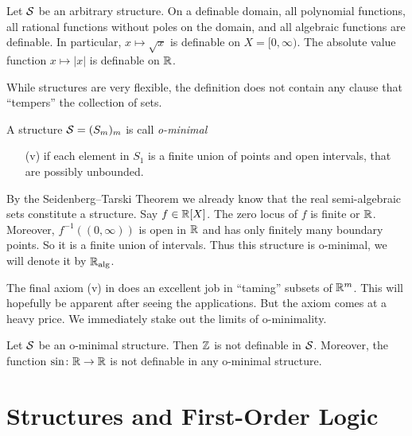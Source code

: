 \begin{example}
  Let ${\mathcal S}$ be an arbitrary structure. 
  On a definable domain, 
  all polynomial functions, all rational functions without poles on the
  domain, and all algebraic functions are definable.
  In particular, $x\mapsto \sqrt{x}$ is definable on $X=[0,\infty)$.
  The absolute value function $x\mapsto |x|$ is definable on ${\mathbb{R}}$.
\end{example}



While structures are very flexible, the definition does not contain
any clause that ``tempers'' the collection of sets.

\begin{definition}
  A {structure} ${\mathcal S}=(S_m)_m$ is call \emph{o-minimal}
  \begin{enumerate}
  \item [(v)]  if each 
  element in $S_1$ is a finite union of points and
  open intervals, that are possibly unbounded.
  \end{enumerate}
\end{definition}

\begin{example}
  By the Seidenberg--Tarski Theorem we already know that the real
  semi-algebraic sets constitute a structure. Say $f\in{\mathbb{R}}[X]$.
  The zero locus of $f$ is finite or ${\mathbb{R}}$. Moreover,
  $f^{-1}((0,\infty))$ is open in ${\mathbb{R}}$ and has only finitely many
  boundary points. So it is a finite union of intervals. Thus this
  structure is o-minimal, we will denote it by ${\mathbb{R}}_{\mathrm{alg}}$. 
\end{example}

The final axiom (v) in does an excellent job in ``taming'' subsets of
${\mathbb{R}}^m$. This will hopefully be apparent after seeing the
applications. But the axiom comes at a heavy price.
We immediately stake out the limits of o-minimality.

\begin{nonexample}
  Let ${\mathcal S}$ be an o-minimal structure. Then ${\mathbb{Z}}$ is not definable in
  ${\mathcal S}$. Moreover, the function $\sin \colon{\mathbb{R}}\rightarrow{\mathbb{R}}$
  is not definable in any o-minimal structure.  
\end{nonexample}

\section{Structures and First-Order Logic}


